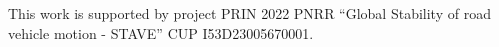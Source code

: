\documentclass[]{interact}
\theoremstyle{plain}%
\theoremstyle{definition}
\theoremstyle{remark}
\begin{document}
This work is supported by project PRIN 2022 PNRR ``Global Stability of road vehicle motion - STAVE'' CUP I53D23005670001.



%
%
%
%
%
%
%






%
%
%
%





%
%
%
%
\end{document}

